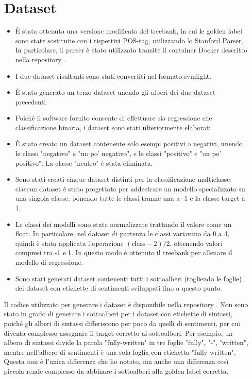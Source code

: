 \section{Dataset}

\begin{itemize}

\item È stata ottenuta una versione modificata del treebank, in cui le golden
    label sono state sostituite con i rispettivi POS-tag, utilizzando lo 
    Stanford Parser. In particolare, il parser è stato utilizzato tramite il 
    container Docker descritto nella repository \cite{docker-parser}.
\item I due dataset risultanti sono stati convertiti nel formato svmlight.
\item È stato generato un terzo dataset unendo gli alberi dei due dataset 
    precedenti.
\item Poiché il software fornito consente di effettuare sia regressione che 
    classificazione binaria, i dataset sono stati ulteriormente elaborati.
\item È stato creato un dataset contenente solo esempi positivi o negativi, 
    unendo le classi "negativo" e "un po' negativo", e le classi "positivo" e 
    "un po' positivo". La classe "neutro" è stata eliminata.
\item Sono stati creati cinque dataset distinti per la classificazione 
    multiclasse; ciascun dataset è stato progettato per addestrare un modello 
    specializzato su una singola classe, ponendo tutte le classi tranne una a -1
    e la classe target a 1.
\item Le classi dei modelli sono state normalizzate trattando il valore come un 
    float. In particolare, nel dataset di partenza le classi variavano da 0 a 4, 
    quindi è stata applicata l'operazione $(\text{class} - 2) / 2$, ottenendo 
    valori compresi tra -1 e 1. In questo modo è ottenuto il treebank per
    allenare il modello di regressione.
\item Sono stati generati dataset contenenti tutti i sottoalberi (togliendo le
    foglie) dei dataset con etichette di sentimenti sviluppati fino a questo
    punto.
\end{itemize}

Il codice utilizzato per generare i dataset è disponibile nella repository 
\cite{repo}. Non sono stato in grado di generare i sottoalberi per i dataset
con etichette di sintassi, poiché gli alberi di sintassi differiscono per poco
da quelli di sentimenti, per cui diventa complesso assegnare il target corretto
ai sottoalberi. Per esempio, un albero di sintassi divide la parola
"fully-written" in tre foglie "fully", "-", "written", mentre nell'albero di
sentimenti è una sola foglia con etichetta "fully-written". Questa non è l'unica
differenza che ho notato, ma anche una differenza così piccola rende complesso
da abbinare i sottoalberi alla golden label corretta.
